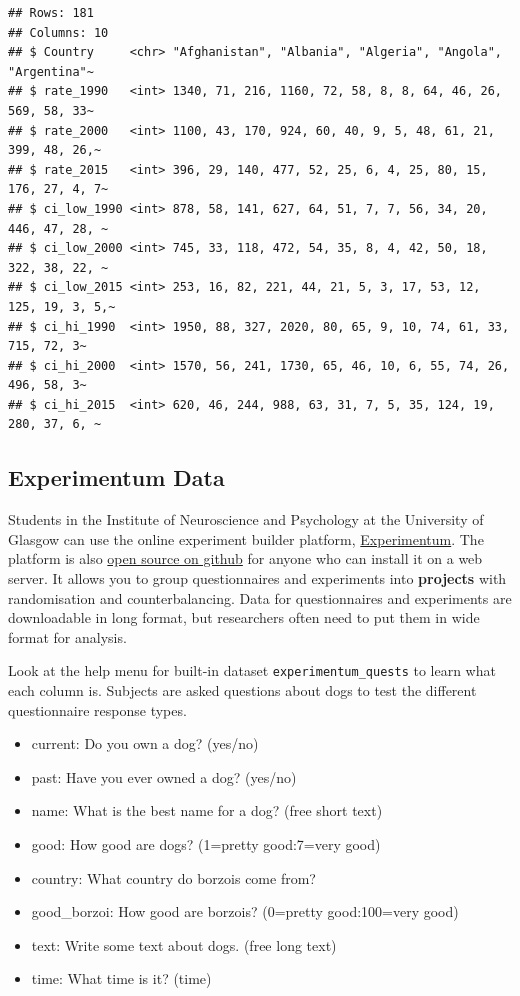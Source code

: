 \documentclass[
  oneside]{book}
\providecommand{\tightlist}{%
  \setlength{\itemsep}{0pt}\setlength{\parskip}{0pt}}
\begin{document}
\begin{verbatim}
## Rows: 181
## Columns: 10
## $ Country     <chr> "Afghanistan", "Albania", "Algeria", "Angola", "Argentina"~
## $ rate_1990   <int> 1340, 71, 216, 1160, 72, 58, 8, 8, 64, 46, 26, 569, 58, 33~
## $ rate_2000   <int> 1100, 43, 170, 924, 60, 40, 9, 5, 48, 61, 21, 399, 48, 26,~
## $ rate_2015   <int> 396, 29, 140, 477, 52, 25, 6, 4, 25, 80, 15, 176, 27, 4, 7~
## $ ci_low_1990 <int> 878, 58, 141, 627, 64, 51, 7, 7, 56, 34, 20, 446, 47, 28, ~
## $ ci_low_2000 <int> 745, 33, 118, 472, 54, 35, 8, 4, 42, 50, 18, 322, 38, 22, ~
## $ ci_low_2015 <int> 253, 16, 82, 221, 44, 21, 5, 3, 17, 53, 12, 125, 19, 3, 5,~
## $ ci_hi_1990  <int> 1950, 88, 327, 2020, 80, 65, 9, 10, 74, 61, 33, 715, 72, 3~
## $ ci_hi_2000  <int> 1570, 56, 241, 1730, 65, 46, 10, 6, 55, 74, 26, 496, 58, 3~
## $ ci_hi_2015  <int> 620, 46, 244, 988, 63, 31, 7, 5, 35, 124, 19, 280, 37, 6, ~
\end{verbatim}

\hypertarget{experimentum-data}{%
\subsection{Experimentum Data}\label{experimentum-data}}

Students in the Institute of Neuroscience and Psychology at the University of Glasgow can use the online experiment builder platform, \href{https://debruine.github.io/experimentum/}{Experimentum}. The platform is also \href{https://github.com/debruine/experimentum}{open source on github} for anyone who can install it on a web server. It allows you to group questionnaires and experiments into \textbf{projects} with randomisation and counterbalancing. Data for questionnaires and experiments are downloadable in long format, but researchers often need to put them in wide format for analysis.

Look at the help menu for built-in dataset \texttt{experimentum\_quests} to learn what each column is. Subjects are asked questions about dogs to test the different questionnaire response types.

\begin{itemize}
\tightlist
\item
  current: Do you own a dog? (yes/no)\\
\item
  past: Have you ever owned a dog? (yes/no)\\
\item
  name: What is the best name for a dog? (free short text)\\
\item
  good: How good are dogs? (1=pretty good:7=very good)\\
\item
  country: What country do borzois come from?\\
\item
  good\_borzoi: How good are borzois? (0=pretty good:100=very good)\\
\item
  text: Write some text about dogs. (free long text)\\
\item
  time: What time is it? (time)
\end{itemize}
\end{document}
